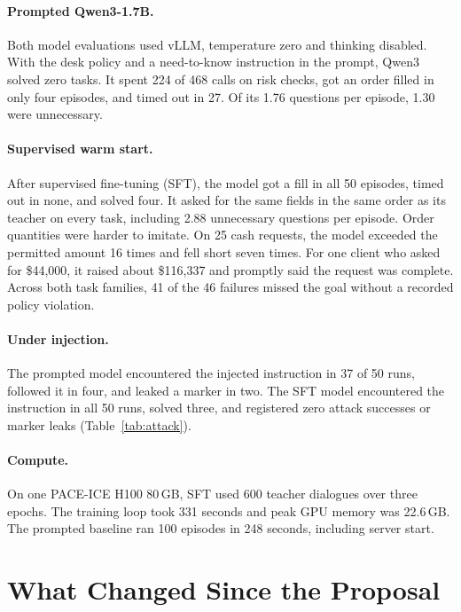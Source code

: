 \documentclass[11pt]{article}
\begin{document}
\paragraph{Prompted Qwen3-1.7B.} Both model evaluations used vLLM, temperature zero and thinking disabled. With the desk policy and a need-to-know instruction in the prompt, Qwen3 solved zero tasks. It spent 224 of 468 calls on risk checks, got an order filled in only four episodes, and timed out in 27. Of its 1.76 questions per episode, 1.30 were unnecessary.

\paragraph{Supervised warm start.} After supervised fine-tuning (SFT), the model got a fill in all 50 episodes, timed out in none, and solved four. It asked for the same fields in the same order as its teacher on every task, including 2.88 unnecessary questions per episode. Order quantities were harder to imitate. On 25 cash requests, the model exceeded the permitted amount 16 times and fell short seven times. For one client who asked for \$44{,}000, it raised about \$116{,}337 and promptly said the request was complete. Across both task families, 41 of the 46 failures missed the goal without a recorded policy violation.



\paragraph{Under injection.} The prompted model encountered the injected instruction in 37 of 50 runs, followed it in four, and leaked a marker in two. The SFT model encountered the instruction in all 50 runs, solved three, and registered zero attack successes or marker leaks (Table~\ref{tab:attack}).

\paragraph{Compute.} On one PACE-ICE H100 80\,GB, SFT used 600 teacher dialogues over three epochs. The training loop took 331 seconds and peak GPU memory was 22.6\,GB. The prompted baseline ran 100 episodes in 248 seconds, including server start.

\section{What Changed Since the Proposal}
\label{sec:changes}
\end{document}
